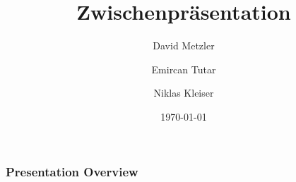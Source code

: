 \documentclass[]{beamer}
\title[]{Zwischenpräsentation}
\author[shortname]{David Metzler \and Emircan Tutar  \and Niklas Kleiser}
\institute[shortinst]{ Hochschule Ravensburg Weingraten\\ \smallskip}
\date{ \today}
\begin{document}

\begin{frame}
	\titlepage %
\end{frame}



\begin{frame}
	\frametitle{Presentation Overview} %

	\tableofcontents %
\end{frame}

\end{document}
